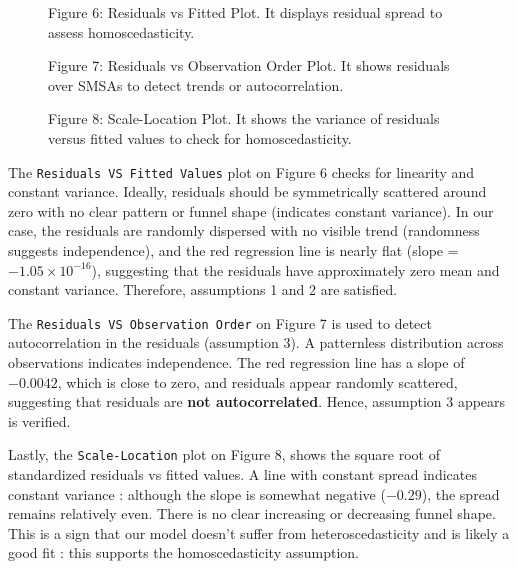 \documentclass[
  12pt,
]{article}
\begin{document}
\begin{figure}[htbp]
\vspace{-1em}
  \centering
  \begin{minipage}[b]{0.3\linewidth}
    {\fontsize{12}{14}\selectfont \small Figure 6: Residuals vs Fitted Plot. It displays residual spread to assess homoscedasticity.\par}
  \end{minipage}
  \hfill
  \begin{minipage}[b]{0.3\linewidth}
    {\fontsize{12}{14}\selectfont \small Figure 7: Residuals vs Observation Order Plot. It shows residuals over SMSAs to detect trends or autocorrelation.\par}
  \end{minipage}
  \hfill
  \begin{minipage}[b]{0.3\linewidth}
    {\fontsize{12}{14}\selectfont \small Figure 8: Scale-Location Plot. It shows the variance of residuals versus fitted values to check for homoscedasticity.\par}
  \end{minipage}
\end{figure}

The \texttt{Residuals\ VS\ Fitted\ Values} plot on Figure 6 checks for
linearity and constant variance. Ideally, residuals should be
symmetrically scattered around zero with no clear pattern or funnel
shape (indicates constant variance). In our case, the residuals are
randomly dispersed with no visible trend (randomness suggests
independence), and the red regression line is nearly flat (slope =
\(-1.05 \times 10^{-16}\)), suggesting that the residuals have
approximately zero mean and constant variance. Therefore, assumptions 1
and 2 are satisfied.

The \texttt{Residuals\ VS\ Observation\ Order} on Figure 7 is used to
detect autocorrelation in the residuals (assumption 3). A patternless
distribution across observations indicates independence. The red
regression line has a slope of \(-0.0042\), which is close to zero, and
residuals appear randomly scattered, suggesting that residuals are
\textbf{not autocorrelated}. Hence, assumption 3 appears is verified.

Lastly, the \texttt{Scale-Location} plot on Figure 8, shows the square
root of standardized residuals vs fitted values. A line with constant
spread indicates constant variance : although the slope is somewhat
negative (\(-0.29\)), the spread remains relatively even. There is no
clear increasing or decreasing funnel shape. This is a sign that our
model doesn't suffer from heteroscedasticity and is likely a good fit :
this supports the homoscedasticity assumption.
\end{document}
